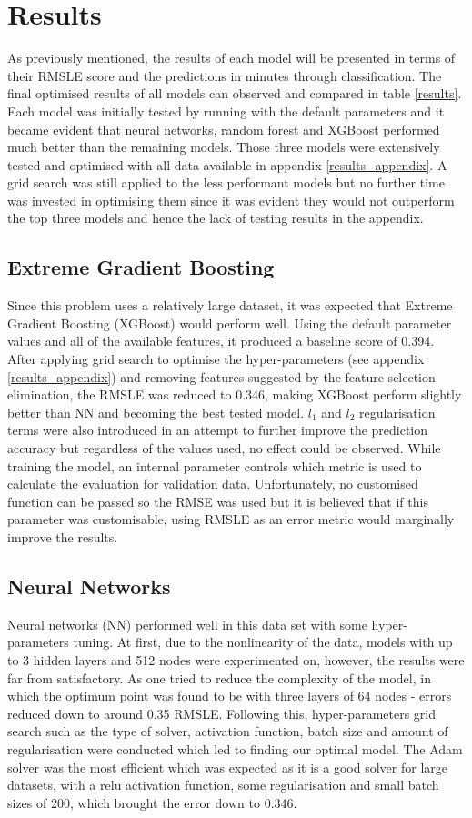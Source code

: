 \documentclass[a4paper]{article}
\begin{document}
\section{Results}
As previously mentioned, the results of each model will be presented in terms of
their RMSLE score and the predictions in minutes through classification. The
final optimised results of all models can observed and compared in table
\ref{results}. Each model was initially tested by running with the default
parameters and it became evident that neural networks, random forest and XGBoost
performed much better than the remaining models. Those three models were
extensively tested and optimised with all data available in appendix
\ref{results_appendix}. A grid search was still applied to the less performant
models but no further time was invested in optimising them since it was evident
they would not outperform the top three models and hence the lack of testing
results in the appendix.

\subsection{Extreme Gradient Boosting}
Since this problem uses a relatively large dataset, it was expected that Extreme
Gradient Boosting (XGBoost) would perform well. Using the default parameter
values and all of the available features, it produced a baseline score of 0.394.
After applying grid search to optimise the hyper-parameters (see appendix
\ref{results_appendix}) and removing features suggested by the feature selection
elimination, the RMSLE was reduced to 0.346, making XGBoost perform slightly
better than NN and becoming the best tested model. $l_1$ and $l_2$
regularisation terms were also introduced in an attempt to further improve the
prediction accuracy but regardless of the values used, no effect could be
observed. While training the model, an internal parameter controls which metric
is used to calculate the evaluation for validation data. Unfortunately, no
customised function can be passed so the RMSE was used but it is believed that
if this parameter was customisable, using RMSLE as an error metric would
marginally improve the results.


\subsection{Neural Networks}
Neural networks (NN) performed well in this data set with some hyper-parameters
tuning. At first, due to the nonlinearity of the data, models with up to 3
hidden layers and 512 nodes were experimented on, however, the results were far
from satisfactory. As one tried to reduce the complexity of the model, in which
the optimum point was found to be with three layers of 64 nodes - errors reduced
down to around 0.35 RMSLE. Following this, hyper-parameters grid search such as
the type of solver, activation function, batch size and amount of regularisation
were conducted which led to finding our optimal model. The Adam solver was the
most efficient which was expected as it is a good solver for large datasets,
with a relu activation function, some regularisation and small batch sizes of
200, which brought the error down to 0.346.
\end{document}

